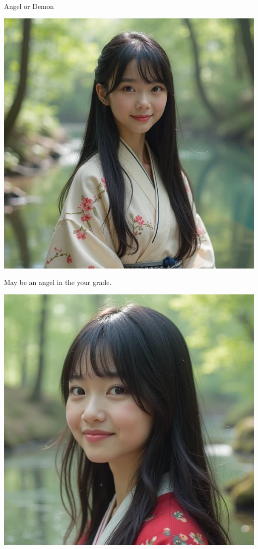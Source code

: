 \documentclass{beamer}
\begin{document}
\begin{frame}{Angel or Demon}
\begin{minipage}{0.4\textwidth}
\begin{center}
\includegraphics[width=\textwidth]{heal.png}
\end{center}
\begin{center}
May be an angel in the your grade.
\end{center}
\end{minipage}
\hfill
\begin{minipage}{0.4\textwidth}
\begin{center}
\includegraphics[width=\textwidth]{kill.png}

\end{center}
\end{minipage}
\end{frame}
\end{document}
